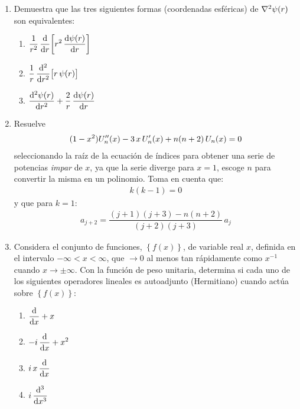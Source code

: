 \begin{enumerate}
\item Demuestra que las tres siguientes formas (coordenadas esféricas) de $\laplacian{\psi} (r)$ son equivalentes:
\begin{multicols}{3}
\begin{enumerate}[label=\alph*)]
\item $\displaystyle \dfrac{1}{r^{2}} \, \dv{r} \bigg[ r^{2} \, \dv{\psi (r)}{r} \bigg]$
\item $\displaystyle  \dfrac{1}{r} \, \dv[2]{r} \big[ r \, \psi (r) \big]$
\item $\displaystyle  \dv[2]{\psi (r)}{r} + \dfrac{2}{r} \, \dv{\psi (r)}{r}$
\end{enumerate}
\end{multicols}
\item Resuelve
\begin{align*}
(1 - x^{2}) {U}^{\prime \prime}_{n} (x) - 3 \, x \, {U}^{\prime}_{n} (x) + n (n + 2) \, U_{n} (x) = 0
\end{align*}
seleccionando la raíz de la ecuación de índices para obtener una serie de potencias \emph{impar} de $x$, ya que la serie diverge para $x = 1$, escoge $n$ para convertir la misma en un polinomio. Toma en cuenta que:
\begin{align*}
k (k - 1) = 0
\end{align*}
y que para $k = 1$:
\begin{align*}
a_{j+2} = \dfrac{(j + 1)(j + 3) - n (n + 2)}{(j + 2)(j + 3)} \, a_{j}
\end{align*}
\item Considera el conjunto de funciones, $\left\{ f (x) \right\}$, de variable real $x$, definida en el intervalo $-\infty < x < \infty$, que $\to 0$ al menos tan rápidamente como $x^{-1}$ cuando $x \to \pm \infty$. Con la función de peso unitaria, determina si cada uno de los siguientes operadores lineales es autoadjunto (Hermitiano) cuando actúa sobre $\left\{ f (x) \right\}$:
\begin{multicols}{2}
\begin{enumerate}[label=\alph*)]
\item $\displaystyle \dv{x} + x$
\item $\displaystyle - i \, \dv{x} + x^{2}$
\item $\displaystyle i \, x \, \dv{x}$
\item $\displaystyle i \, \dv[3]{x}$
\end{enumerate}

\end{multicols}
\end{enumerate}
